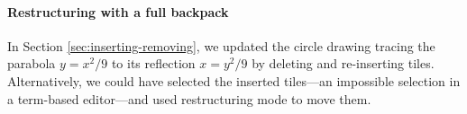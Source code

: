 




\paragraph{Restructuring with a full backpack}
In Section \ref{sec:inserting-removing}, we updated the circle drawing tracing the
parabola $y = x^2/9$ to its reflection $x = y^2/9$ by deleting
and re-inserting tiles.
Alternatively, we could have selected the inserted tiles---an impossible
selection in a term-based editor---and used
restructuring mode to move them.

